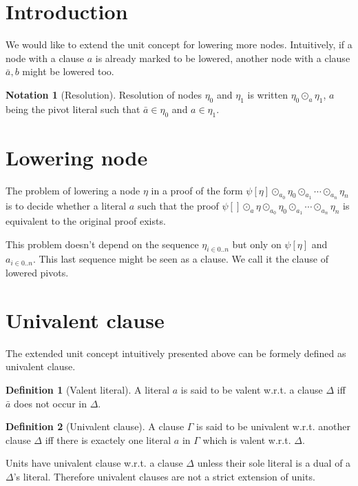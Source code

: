 \documentclass[a4paper]{article}
\theoremstyle{definition}
\newtheorem{defn}{Definition}
\newtheorem*{nota}{Notation}
\begin{document}
\section{Introduction}

We would like to extend the unit concept for lowering more nodes. Intuitively,
if a node with a clause $a$ is already marked to be lowered, another node with
a clause $\bar{a},b$ might be lowered too.

\begin{nota}[Resolution]
Resolution of nodes $\eta_0$ and $\eta_1$ is written $\eta_0 \odot_a
\eta_1$, $a$ being the pivot literal such that $\bar{a} \in \eta_0$ and $a
\in \eta_1$.
\end{nota}

\section{Lowering node}

The problem of lowering a node $\eta$ in a proof of the form $\psi[\eta]
\odot_{a_0} \eta_0 \odot_{a_1} \cdots \odot_{a_n} \eta_n$ is to decide
whether a literal $a$ such that the proof $\psi[] \odot_a \eta
\odot_{a_0} \eta_0 \odot_{a_1} \cdots \odot_{a_n} \eta_n$ is equivalent to
the original proof exists.

This problem doesn't depend on the sequence $\eta_{i \in 0..n}$ but only on
$\psi[\eta]$ and $a_{i \in 0..n}$. This last sequence might be seen as a
clause. We call it the clause of lowered pivots.

\section{Univalent clause}

The extended unit concept intuitively presented above can be formely defined as
univalent clause.

\begin{defn}[Valent literal]
A literal $a$ is said to be valent w.r.t. a clause $\Delta$ iff $\bar{a}$ does
not occur in $\Delta$.
\end{defn}

\begin{defn}[Univalent clause]
A clause $\Gamma$ is said to be univalent w.r.t. another clause $\Delta$ iff
there is exactely one literal $a$ in $\Gamma$ which is valent w.r.t. $\Delta$.
\end{defn}

Units have univalent clause w.r.t. a clause $\Delta$ unless their sole literal
is a dual of a $\Delta$'s literal. Therefore univalent clauses are not a
strict extension of units.
\end{document}
